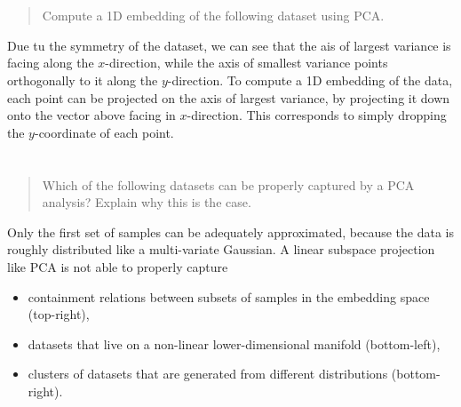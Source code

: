 \documentclass[english]{exercise}
\begin{document}
	\section{}

	\begin{quote}
		Compute a 1D embedding of the following dataset using PCA.
	\end{quote}

	Due tu the symmetry of the dataset, we can see that the ais of largest variance is facing along the \(x\)-direction, while the axis of smallest variance points orthogonally to it along the \(y\)-direction.
	To compute a 1D embedding of the data, each point can be projected on the axis of largest variance, by projecting it down onto the vector above facing in \(x\)-direction.
	This corresponds to simply dropping the \(y\)-coordinate of each point.


	\section{}

	\begin{quote}
		Which of the following datasets can be properly captured by a PCA analysis?
		Explain why this is the case.
	\end{quote}

	Only the first set of samples can be adequately approximated, because the data is roughly distributed like a multi-variate Gaussian.
	A linear subspace projection like PCA is not able to properly capture
	\begin{itemize}
		\item containment relations between subsets of samples in the embedding space (top-right),
		\item datasets that live on a non-linear lower-dimensional manifold (bottom-left),
		\item clusters of datasets that are generated from different distributions (bottom-right).
	\end{itemize}
\end{document}
